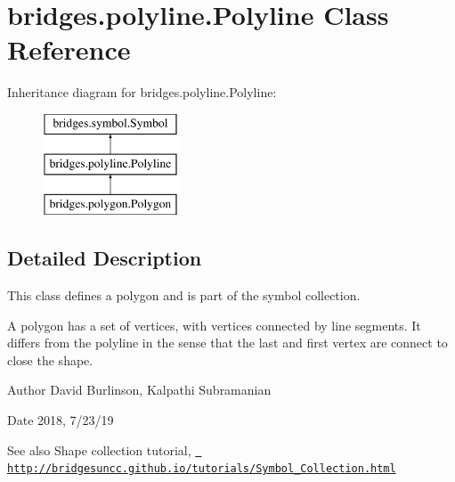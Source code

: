 \hypertarget{classbridges_1_1polyline_1_1_polyline}{}\section{bridges.\+polyline.\+Polyline Class Reference}
\label{classbridges_1_1polyline_1_1_polyline}
Inheritance diagram for bridges.\+polyline.\+Polyline\+:\begin{figure}[H]
\begin{center}
\leavevmode
\includegraphics[height=3.000000cm]{classbridges_1_1polyline_1_1_polyline}
\end{center}
\end{figure}


\subsection{Detailed Description}
This class defines a polygon and is part of the symbol collection. 

A polygon has a set of vertices, with vertices connected by line segments. It differs from the polyline in the sense that the last and first vertex are connect to close the shape.

\begin{DoxyAuthor}{Author}
David Burlinson, Kalpathi Subramanian
\end{DoxyAuthor}
\begin{DoxyDate}{Date}
2018, 7/23/19
\end{DoxyDate}
\begin{DoxySeeAlso}{See also}
Shape collection tutorial, \href{http://bridgesuncc.github.io/tutorials/Symbol_Collection.html}{\texttt{ http\+://bridgesuncc.\+github.\+io/tutorials/\+Symbol\+\_\+\+Collection.\+html}} 
\end{DoxySeeAlso}
